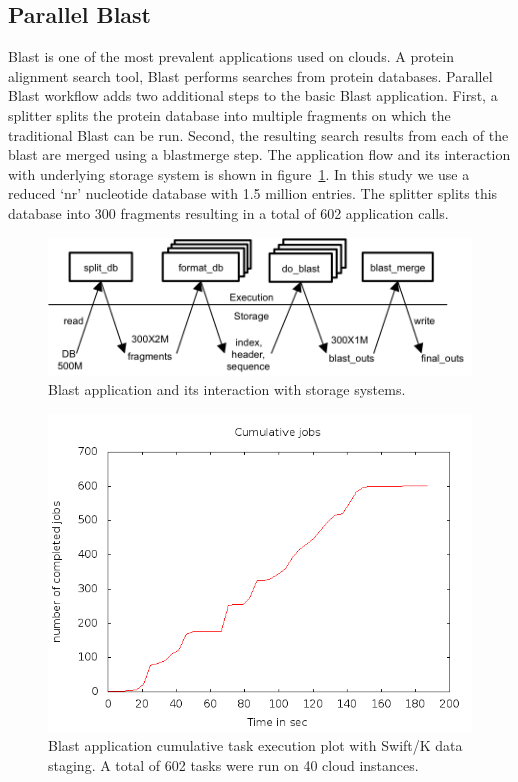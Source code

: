 \documentclass[10pt,journal,cspaper,compsoc]{IEEEtran}
\begin{document}
\subsection{Parallel Blast}
Blast is one of the most prevalent applications used on clouds. A protein
alignment search tool, Blast performs searches from protein databases. Parallel
Blast workflow adds two additional steps to the basic Blast application. First,
a splitter splits the protein database into multiple fragments on which the
traditional Blast can be run. Second, the resulting search results from each of
the blast are merged using a blastmerge step. The application flow and its
interaction with underlying storage system is shown in figure~\ref{fig_blast}.
In this study we use a reduced `nr' nucleotide database with 1.5 million
entries. The splitter splits this database into 300 fragments resulting in a
total of 602 application calls.

\begin{figure}[htb]
\begin{center}
\includegraphics[width=\linewidth]{figures/blast.png}
\caption{Blast application and its interaction with storage systems. 
\label{fig_blast}
}
\end{center}
\end{figure}

\begin{figure}[htb]
\begin{center}
\includegraphics[width=\linewidth]{plots/blast_40i_80c.png}
\caption{Blast application cumulative task execution plot with Swift/K data staging. A total of 602 tasks were run on 40 cloud instances. 
\label{fig_blast_k}
}
\end{center}
\end{figure}
\end{document}
